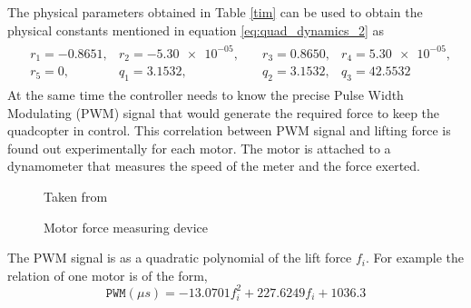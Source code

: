 \documentclass[letterpaper%
, twoside%
, 12pt%
,memoire%
, english%
,creativecommons,hyperref%
]{thETS}
\theoremstyle{newThmStyle}
\begin{document}
The physical parameters obtained in Table \ref{tim} can be used to obtain the physical constants mentioned in equation \eqref{eq:quad_dynamics_2} as
\begin{align}
\begin{aligned}
&r_{1}=-0.8651, 
&r_{2}=\num{-5.30e-05}, \quad
&r_{3}= 0.8650, 
&r_{4}= \num{5.30e-05} ,\\
&r_{5}=0, 
&q_{1}= 3.1532, \quad \quad \quad
&q_{2}= 3.1532, 
&q_{3}= 42.5532
\end{aligned}
\end{align}
At the same time the controller needs to know the precise Pulse Width Modulating (PWM) signal that would generate the required force to keep the quadcopter in control. This correlation between PWM signal and lifting force is found out experimentally for each motor. The motor is attached to a dynamometer that measures the speed of the meter and the force exerted. 
\begin{figure}
	\centering
	\parbox{0.75\textwidth}{
		\begin{center}
		\caption{Motor force measuring device\label{rcd_c2}}Taken from \citep{RN121}
		\end{center}	
	}
\end{figure}

The PWM signal is as a quadratic polynomial of the lift force $f_i$. For example the relation of one motor is of the form, 
\begin{equation} \label{eqn:pwmforce}
\texttt{PWM} (\mu s)= -13.0701f_i^2+227.6249f_i +1036.3
\end{equation}
\end{document}
